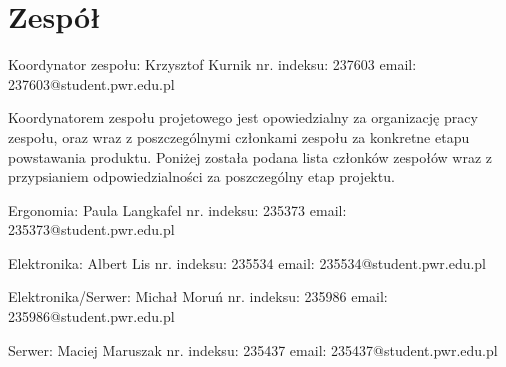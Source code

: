 \documentclass[10pt, a4paper]{article}
\begin{document}
\section{Zespół}
\begin{description}[font=$\bullet$~\normalfont]
\item Koordynator zespołu: Krzysztof Kurnik nr. indeksu: 237603 email: 237603@student.pwr.edu.pl
\end{description}
Koordynatorem zespołu projetowego jest opowiedzialny za organizację pracy zespołu, oraz wraz z poszczególnymi członkami zespołu za konkretne etapu powstawania produktu. Poniżej została podana lista członków zespołów wraz z przypsianiem odpowiedzialności za poszczególny etap projektu.
\begin{description}[font=$\bullet$~\normalfont]
\item Ergonomia: Paula Langkafel nr. indeksu: 235373 email: 235373@student.pwr.edu.pl
\item Elektronika: Albert Lis nr. indeksu: 235534 email: 235534@student.pwr.edu.pl
\item Elektronika/Serwer: Michał Moruń nr. indeksu: 235986 email: 235986@student.pwr.edu.pl
\item Serwer: Maciej Maruszak nr. indeksu: 235437 email: 235437@student.pwr.edu.pl
\end{description}
\end{document}
